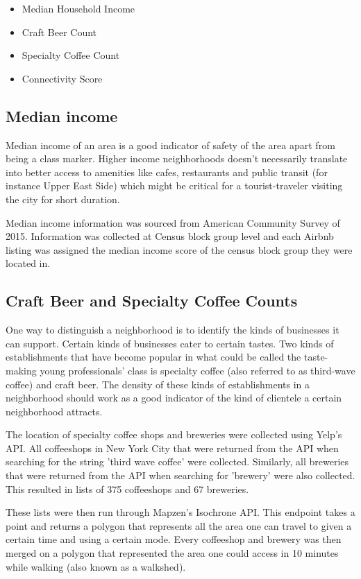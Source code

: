 \documentclass[conference]{IEEEtran}
\begin{document}
\begin{itemize}
  \item Median Household Income
  \item Craft Beer Count
  \item Specialty Coffee Count
  \item Connectivity Score
\end{itemize}

\subsection{Median income}
Median income of an area is a good indicator of safety of the area apart from being a class marker. Higher income neighborhoods doesn't necessarily translate into better access to amenities like cafes, restaurants and public transit (for instance Upper East Side) which might be critical for a tourist-traveler visiting the city for short duration.

Median income information was sourced from American Community Survey of 2015. Information was collected at Census block group level and each Airbnb listing was assigned the median income score of the census block group they were located in.

\subsection{Craft Beer and Specialty Coffee Counts}
One way to distinguish a neighborhood is to identify the kinds of businesses it can support.
Certain kinds of businesses cater to certain tastes. Two kinds of establishments that have
become popular in what could be called the taste-making young professionals' class is
specialty coffee (also referred to as third-wave coffee) and craft beer. The density
of these kinds of establishments in a neighborhood should work as a good indicator of
the kind of clientele a certain neighborhood attracts.

The location of specialty coffee shops and breweries were collected using Yelp's API.\cite{yelp_api}
All coffeeshops in New York City that were returned from the API when searching for the
string 'third wave coffee' were collected. Similarly, all breweries that were returned
from the API when searching for 'brewery' were also collected. This resulted in lists of
375 coffeeshops and 67 breweries.

These lists were then run through Mapzen's Isochrone API.\cite{mapzen_isochrone} This endpoint takes a point
and returns a polygon that represents all the area one can travel to given a certain time
and using a certain mode. Every coffeeshop and brewery was then merged on a polygon that
represented the area one could access in 10 minutes while walking (also known as a walkshed).
\end{document}

